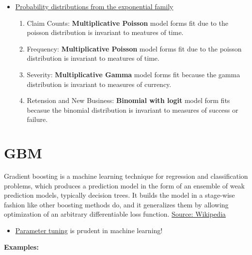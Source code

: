 \documentclass[]{book}
\providecommand{\tightlist}{%
  \setlength{\itemsep}{0pt}\setlength{\parskip}{0pt}}
\begin{document}
\begin{itemize}
\item
  \href{https://en.wikipedia.org/wiki/Exponential_family}{Probability
  distributions from the exponential family}

  \begin{enumerate}
  \def\labelenumi{\arabic{enumi}.}
  \tightlist
  \item
    Claim Counts: \textbf{Multiplicative Poisson} model forms fit due to
    the poisson distribution is invariant to meatures of time.
  \item
    Frequency: \textbf{Multiplicative Poisson} model forms fit due to
    the poisson distribution is invariant to meatures of time.
  \item
    Severity: \textbf{Multiplicative Gamma} model forms fit because the
    gamma distribution is invariant to measures of currency.
  \item
    Retension and New Business: \textbf{Binomial with logit} model form
    fits becasue the binomial distribution is invariant to measures of
    success or failure.
  \end{enumerate}
\end{itemize}

\section{\texorpdfstring{\textbf{GBM}}{GBM}}\label{gbm}

Gradient boosting is a machine learning technique for regression and
classification problems, which produces a prediction model in the form
of an ensemble of weak prediction models, typically decision trees. It
builds the model in a stage-wise fashion like other boosting methods do,
and it generalizes them by allowing optimization of an arbitrary
differentiable loss function.
\href{https://en.wikipedia.org/wiki/Gradient_boosting}{Source:
Wikipedia}

\begin{itemize}
\tightlist
\item
  \href{https://www.analyticsvidhya.com/blog/2016/02/complete-guide-parameter-tuning-gradient-boosting-gbm-python/}{Parameter
  tuning} is prudent in machine learning!
\end{itemize}

\textbf{Examples:}
\end{document}
